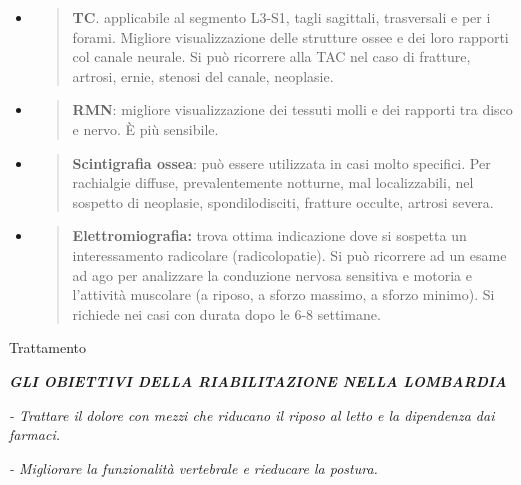 \documentclass[]{article}
\begin{document}
\begin{itemize}
\item
  \begin{quote}
  \textbf{TC}. applicabile al segmento L3-S1, tagli sagittali,
  trasversali e per i forami. Migliore visualizzazione delle strutture
  ossee e dei loro rapporti col canale neurale. Si può ricorrere alla
  TAC nel caso di fratture, artrosi, ernie, stenosi del canale,
  neoplasie.
  \end{quote}
\end{itemize}

\begin{itemize}
\item
  \begin{quote}
  \textbf{RMN}: migliore visualizzazione dei tessuti molli e dei
  rapporti tra disco e nervo. È più sensibile.
  \end{quote}
\end{itemize}

\begin{itemize}
\item
  \begin{quote}
  \textbf{Scintigrafia ossea}: può essere utilizzata in casi molto
  specifici. Per rachialgie diffuse, prevalentemente notturne, mal
  localizzabili, nel sospetto di neoplasie, spondilodisciti, fratture
  occulte, artrosi severa.
  \end{quote}
\end{itemize}

\begin{itemize}
\item
  \begin{quote}
  \textbf{Elettromiografia:} trova ottima indicazione dove si sospetta
  un interessamento radicolare (radicolopatie). Si può ricorrere ad un
  esame ad ago per analizzare la conduzione nervosa sensitiva e motoria
  e l'attività muscolare (a riposo, a sforzo massimo, a sforzo minimo).
  Si richiede nei casi con durata dopo le 6-8 settimane.
  \end{quote}
\end{itemize}

Trattamento

\emph{\textbf{GLI OBIETTIVI DELLA RIABILITAZIONE NELLA LOMBARDIA}}

\emph{- Trattare il dolore con mezzi che riducano il riposo al letto e
la dipendenza dai farmaci. }

\emph{- Migliorare la funzionalità vertebrale e rieducare la postura. }
\end{document}
